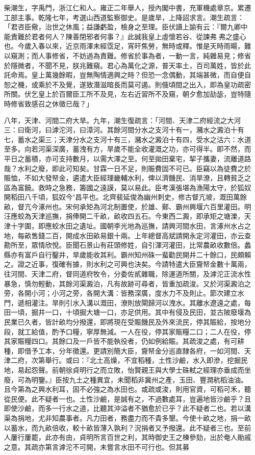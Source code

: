 \begin{pinyinscope}
柴潮生，字禹門，浙江仁和人。雍正二年舉人，授內閣中書，充軍機處章京。累遷工部主事。乾隆七年，考選山西道監察御史。是歲旱，上降詔求言。潮生疏言：「君咨臣儆，治世之休風；益謙虧盈，檢身之至理。臣伏讀上諭有云：『爾九卿中能責難於君者何人？陳善閉邪者何事？』此誠我皇上虛懷若谷、從諫弗弗之盛心也。今歲入春以來，近京雨澤未經霑足，宵旰焦勞，無時或釋。惟是天時雨暘，難以窺測；而人事修省，不妨過為責難。修省於事為者，一動一言，純雜易見；修省於隱微者，不聞不見，朕兆難窺。君心為萬化之源，普天率土，百司萬姓，皆於此託命焉。皇上萬幾餘暇，豈無陶情適興之時？但恐一念偶動，其端甚微，而自便自恕之機，或乘於不及覺，遂致潛滋暗長而莫可遏。則俄頃間之出入，即為皇功疏密所關。伏乞皇上於百爾臣工所不及見，左右近習所不及窺，朝夕愈加劼毖，豈特隨時修省致感召之休徵已哉？」

八年，天津、河間二府大旱。九年，潮生復疏言：「河間、天津二府經流之大河三：曰衛河，曰滹沱河，曰漳河。其餘河間分水之支河十有一，瀦水之澱泊十有七，蓄水之渠三；天津分水之支河十有三，瀦水之澱泊十有四，受水之沽六：水道至多。向若河渠深廣，蓄洩有方，旱歲不能全收灌溉之功，亦可得半。即不然，而平日之蓄積，亦可支持數月，以需大澤之至。何至拋田棄宅，挈子攜妻，流離道路哉？水利之廢，即此可知矣。甘霖一日不足，則賑費固不可已。臣竊以為徒費之於賑恤，不如大發帑金，遴遣大臣經理畿輔水利，俾以濟饑民、消旱潦，且轉貧乏之區為富饒。救時之急務，籌國之遠謨，莫以易此。臣考漢張堪為漁陽太守，於狐奴開稻田八千頃，狐奴今"昌平也。北齊裴延俊為幽州刺史，修古督亢坡，溉田萬餘畝，督亢今涿州也。宋何承矩為河北制置使，於雄、鄚、霸州興堰六百里灌田。明汪應蛟為天津巡撫，捐俸開二千畝，畝收四五石。今東西二澱，即承矩之塘濼，天津十字圍，即應蛟水田之遺址。國朝李光地為巡撫，請興河間水田，言涿州水占之地，每畝售錢二百，開成水田畝易銀十兩。上年總督高斌請開永定河灌田，亦云查勘所至，眾情欣悅。臣聞石景山有莊頭修姓，自引渾河灌田，比常農畝收數倍。蠡縣亦有富戶自行鑿井，旱歲能收其利。霸州知州硃一蜚勸民開井二十餘口，民頗賴之。證之近事，復確有據，則水利之可興也決矣。今請特遣大臣齎帑金數十萬兩，往河間、天津二府，督同道府牧令，分委佐貳雜職，除運道所關，及滹沱正流水性暴急，慎勿輕動，其餘河渠澱泊，凡有故跡可尋者，皆重加疏浚。又於河渠澱泊之旁，各開小河；小河之旁，各開大溝：皆務深廣，度水力不及則止。節次建立水門，遞相灌注。旱則引水入溝以溉田，潦則放閘歸河以洩水。其離水遼遠之處，每田一頃，掘井一口，十頃掘大塘一口，亦足供用。其中有侵及民田，並古陂廢堰為民業已久者，皆計畝均分撥還，即將現在受賑饑民及外來流民，停其賑給，按地分段，就工給值，酌予口糧，寧厚無減。一人在役，停其家賑糧二口；二人在役，停其家賑糧四口。其餘口及一戶皆不能執役者，仍如例給賑。其疏浚之處，有可耕種，即借予工本，分年徵還。更請別簡大臣，齎帑金分巡直隸各府，一如河間、天津二府，次第舉行。或曰：『北土高燥，不宜稻種，土性沙鹼，水入即滲，挖掘民地，易起怨聲。前朝徐貞明行之而立敗，怡賢親王與大學士硃軾之經理亦垂成而坐廢，可為明鑒。』臣按九土之種異宜，未聞稻非冀州之產，玉田、豐潤秔稻油油。且今第為之興水利耳，固不必強之為水田也。或疏或浚，則用官資，可稻可禾，聽從民便。此不疑者一也。土性沙鹼，是誠有之，不過數處耳，豈遍地皆沙鹼乎？且即使沙鹼，而多一行水之道，比聽其沖溢者不猶愈於已乎？此不疑者二也。若以溝渠為捐地，尤非知農事者。凡力田者，務盡力而不貴多墾。今使十畝之地，捐一畝以蓄水，而九畝倍收，較十畝皆薄入孰利？況捐者又予撥還。此不疑者三也。至前人屢行屢罷，此亦有由，貞明所言百世之利，其時御史王之棟參劾，出於奄人勛戚之意。其疏亦第言滹沱不可開，未嘗言水田不可行也。但其募
\end{pinyinscope}
